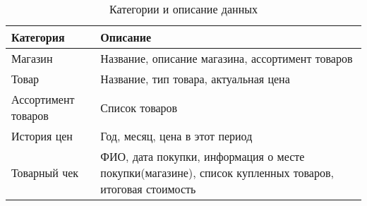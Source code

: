 \documentclass[a4paper,14pt]{extreport}
\begin{document}
\captionsetup[table]{skip=-12pt}
\captionsetup{singlelinecheck = false, justification=raggedright}
\begin{table}[H]
	\caption{Категории и описание данных}
	\begin{center}
		\begin{tabular}{| l | p{11 cm} |} 
			\hline
			
			\textbf{Категория} & \textbf{Описание} \\  
			
			\hline
			
			Магазин & Название, описание магазина, ассортимент товаров \\
			
			\hline
			
			Товар & Название, тип товара, актуальная цена \\
			
			\hline
			
			Ассортимент товаров & Список товаров \\
			
			\hline
			
			История цен & Год, месяц, цена в этот период \\
			
			\hline
			
			Товарный чек & ФИО, дата покупки, информация о месте покупки(магазине), список купленных товаров, итоговая стоимость \\
			\hline
		\end{tabular}
	\end{center}
\end{table}
\end{document}
